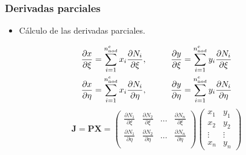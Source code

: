 \documentclass{beamer}
\begin{document}
\begin{frame}
\frametitle{Derivadas parciales}
\begin{itemize}
\item Cálculo de las derivadas parciales.
\end{itemize}
\begin{alignat}{2}
\frac{\partial x}{\partial \xi}&=\sum_{i=1}^{n^e_{\textrm nod}}
x_i \frac{\partial N_i}{\partial \xi},\qquad
&
\frac{\partial y}{\partial \xi}&=\sum_{i=1}^{n^e_{\textrm nod}}
y_i \frac{\partial N_i}{\partial \xi} \\
%
\frac{\partial x}{\partial \eta}&=\sum_{i=1}^{n^e_{\textrm nod}}
x_i \frac{\partial N_i}{\partial \eta},\qquad
&
\frac{\partial y}{\partial \eta}&=\sum_{i=1}^{n^e_{\textrm nod}}
y_i \frac{\partial N_i}{\partial \eta}
\end{alignat}
\begin{equation}
\bm{J}=\mathbf{P}\mathbf{X}=
\left(
\begin{array}{cccc}
\frac{\partial N_1}{\partial \xi}&
\frac{\partial N_2}{\partial \xi}&
\ldots                           &
\frac{\partial N_n}{\partial \xi}\\
%
\frac{\partial N_1}{\partial \eta}&
\frac{\partial N_2}{\partial \eta}&
\ldots                           &
\frac{\partial N_n}{\partial \eta}\\
\end{array}
\right)
\left(
\begin{array}{cc}
x_1    & y_1 \\
x_2    & y_2 \\
\vdots & \vdots \\
x_n    & y_n
\end{array}
\right)
\end{equation}
\end{frame}
\end{document}
